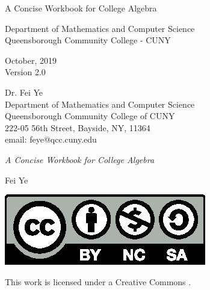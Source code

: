 
\begin{titlepage}
	\thispagestyle{empty}%

	\begin{center}
		\bfseries
		\vspace*{2\baselineskip}
		{\Huge\raggedright \color{main} A Concise Workbook for College Algebra \par}
		\hrulefill\par
		{\LARGE\raggedleft \color{third}{Fei Ye}\par}%
	\end{center}%
	\vspace*{10\baselineskip}
	\vfill
	\color{second}
	\begin{center}
		{
		\large\color{second}
		Department of Mathematics and Computer Science\\[1ex]
		Queensborough Community College - CUNY\\[3ex]
		}

		{\cyan
		 October, 2019\\[1ex]
		 Version 2.0
		}
	\end{center}

	\vspace*{1\baselineskip}

	\end{titlepage}


	\frontmatter
	\thispagestyle{empty}
	
	\vspace*{2\baselineskip}
	
	
	\begin{flushleft}
		Dr. Fei Ye\\
		Department of Mathematics and Computer Science\\
		Queensborough Community College of CUNY\\
		222-05 56th Street, Bayside, NY, 11364\\
		email: feye@qcc.cuny.edu
	
		\null\vfill
	
		\textit{A Concise Workbook for College Algebra}
	
		\bigskip
	
		Fei Ye
	
		\bigskip
	
	
	
	
		\includegraphics{pics/by-nc-sa.eps}
	
		This work is licensed under a Creative Commons
		\href{https://creativecommons.org/licenses/by-nc-sa/4.0/}{}.
	
	\end{flushleft}